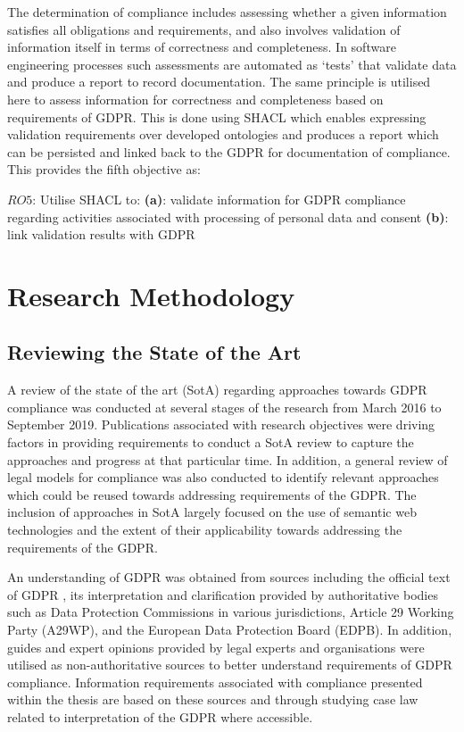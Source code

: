 The determination of compliance includes assessing whether a given information satisfies all obligations and requirements, and also involves validation of information itself in terms of correctness and completeness.
In software engineering processes such assessments are automated as `tests' that validate data and produce a report to record documentation.
The same principle is utilised here to assess information for correctness and completeness based on requirements of GDPR.
This is done using SHACL which enables expressing validation requirements over developed ontologies and produces a report which can be persisted and linked back to the GDPR for documentation of compliance.
This provides the fifth objective as:
\begin{framed}
$RO5$: Utilise SHACL to:
\newline\indent\indent\textbf{(a)}: validate information for GDPR compliance regarding activities associated with processing of personal data and consent
\newline\indent\indent\textbf{(b)}: link validation results with GDPR
\end{framed}

\section{Research Methodology}\label{sec:intro:research-methodology}
\subsection{Reviewing the State of the Art}
A review of the state of the art (SotA) regarding approaches towards GDPR compliance was conducted at several stages of the research from March 2016 to September 2019.
Publications associated with research objectives were driving factors in providing requirements to conduct a SotA review to capture the approaches and progress at that particular time.
In addition, a general review of legal models for compliance was also conducted to identify relevant approaches which could be reused towards addressing requirements of the GDPR.
The inclusion of approaches in SotA largely focused on the use of semantic web technologies and the extent of their applicability towards addressing the requirements of the GDPR.

An understanding of GDPR was obtained from sources including the official text of GDPR \cite{Regulation_GDPR}, its interpretation and clarification provided by authoritative bodies such as Data Protection Commissions in various jurisdictions, Article 29 Working Party (A29WP), and the European Data Protection Board (EDPB).
In addition, guides and expert opinions provided by legal experts and organisations were utilised as non-authoritative sources to better understand requirements of GDPR compliance.
Information requirements associated with compliance presented within the thesis are based on these sources and through studying case law related to interpretation of the GDPR where accessible.

